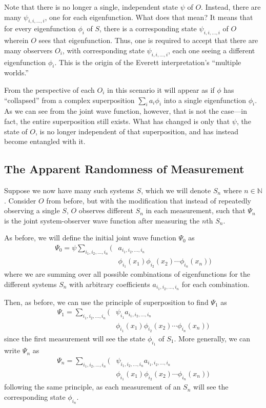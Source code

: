 \documentclass[
    12pt,
    letterpaper,
    aps,
    prd,
    longbibliography,
    twocolumn,
    nofootinbib,
    raggedbottom,
    amsmath,
    amssymb,
    amsfonts,
]{revtex4-1}
\newcommand{\mbb}[1]{\mathbb{#1}}
\begin{document}
Note that there is no longer a single, independent state $\psi$ of $O$. Instead, there are many $\psi_{i,i,\ldots,i}$, one for each eigenfunction. What does that mean? It means that for every eigenfunction $\phi_i$ of $S$, there is a corresponding state $\psi_{i,i,\ldots,i}$ of $O$ wherein $O$ sees that eigenfunction. Thus, one is required to accept that there are many observers $O_i$, with corresponding state $\psi_{i,i,\ldots,i}$, each one seeing a different eigenfunction $\phi_i$. This is the origin of the Everett interpretation's ``multiple worlds.''

From the perspective of each $O_i$ in this scenario it will appear as if $\phi$ has ``collapsed'' from a complex superposition $\sum_i a_i \phi_i$ into a single eigenfunction $\phi_i$. As we can see from the joint wave function, however, that is not the case---in fact, the entire superposition still exists. What has changed is only that $\psi$, the state of $O$, is no longer independent of that superposition, and has instead become entangled with it.

\subsection{The Apparent Randomness of Measurement}

Suppose we now have many such systems $S$, which we will denote $S_n$ where $n \in \mbb N$. Consider $O$ from before, but with the modification that instead of repeatedly observing a single $S$, $O$ observes different $S_n$ in each measurement, such that $\Psi_n$ is the joint system-observer wave function after measuring the $n$th $S_n$.

As before, we will define the initial joint wave function $\Psi_0$ as
\begin{align*}
    \Psi_0 = \psi \sum_{i_1, i_2, \ldots, i_n}\big( & a_{i_1, i_2, \ldots, i_n} \\
    & \phi_{i_1}(x_1) \phi_{i_2}(x_2) \cdots \phi_{i_n}(x_n) \big)
\end{align*}
where we are summing over all possible combinations of eigenfunctions for the different systems $S_n$ with arbitrary coefficients $a_{i_1, i_2, \ldots, i_n}$ for each combination.

Then, as before, we can use the principle of superposition to find $\Psi_1$ as
\begin{align*}
    \Psi_1 = \sum_{i_1, i_2, \ldots, i_n}\big( & \psi_{i_1} a_{i_1, i_2, \ldots, i_n} \\
    & \phi_{i_1}(x_1) \phi_{i_2}(x_2) \cdots \phi_{i_n}(x_n) \big)
\end{align*}
since the first measurement will see the state $\phi_{i_1}$ of $S_1$. More generally, we can write $\Psi_n$ as
\begin{align*}
    \Psi_n = \sum_{i_1, i_2, \ldots, i_n}\big( & \psi_{i_1, i_2, \ldots, i_n} a_{i_1, i_2, \ldots, i_n} \\
    & \phi_{i_1}(x_1) \phi_{i_2}(x_2) \cdots \phi_{i_n}(x_n) \big)
\end{align*}
following the same principle, as each measurement of an $S_n$ will see the corresponding state $\phi_{i_n}$.
\end{document}
